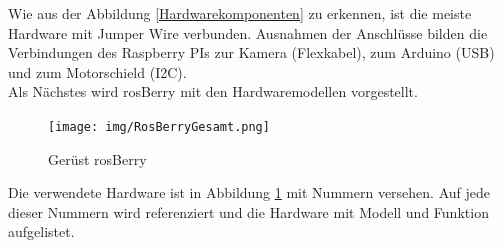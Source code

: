 \documentclass[conference]{IEEEtran}
\begin{document}
	Wie aus der Abbildung \ref{Hardwarekomponenten} zu erkennen, ist die meiste Hardware mit Jumper Wire verbunden. Ausnahmen der Anschlüsse bilden die Verbindungen des Raspberry PIs zur Kamera (Flexkabel), zum Arduino (USB) und zum Motorschield (I2C).\\
	
	Als Nächstes wird rosBerry mit den Hardwaremodellen vorgestellt.
	\\
	\begin{figure}[!ht]
		\centering
		\texttt{[image: img/RosBerryGesamt.png]}
		\caption{Gerüst rosBerry}
		\label{rosBerryGesamt}
	\end{figure}
	
	Die verwendete Hardware ist in Abbildung \ref{rosBerryGesamt} mit Nummern versehen. Auf jede dieser Nummern wird referenziert und die Hardware mit Modell und Funktion aufgelistet.
	
\end{document}

